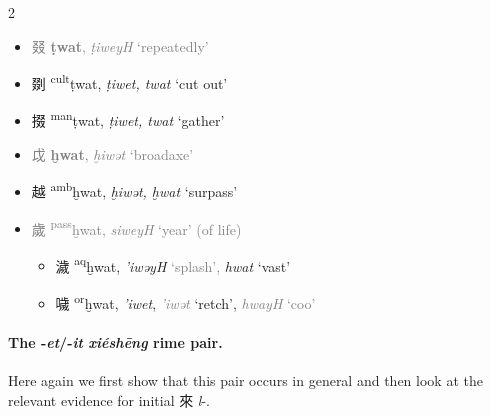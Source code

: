 \begin{multicols}{2}
\raggedcolumns
\begin{itemize}
  \item \textcolor{gray}{ {\Large{叕}} %
    {\large{\textbf{ṭwat}}},
    \textit{ṭiweyH} `repeatedly'} %

  \item {\Large{剟}} %
    {\large{{\textsuperscript{cult}}ṭwat}},
    \textit{ṭiwet, twat} `cut out' %

  \item {\Large{掇}} %
    {\large{{\textsuperscript{man}}ṭwat}},
    \textit{ṭiwet, twat} `gather' %
\end{itemize}

\medskip

\begin{minipage}{\columnwidth}
\begin{itemize}[leftmargin=*, labelsep=0.5em]   
  \item  \textcolor{gray}{{\Large{戉}} %
    {\large{\textbf{ḫwat}}},
    \textit{ḫiwət} `broadaxe'} %

  \item {\Large{越}} %
    {\large{{\textsuperscript{amb}}ḫwat}},
    \textit{ḫiwət, ḫwat} `surpass' %

  \item \textcolor{gray}{{\Large{歲}} 
    {\large{{\textsuperscript{pass}}ḫwat}}, \textit{siweyH} `year' (of life)}


\begin{itemize}
  \item {\Large{濊}} %
    {\large{{\textsuperscript{aq}}ḫwat}},
    \textit{'iwəyH} \textcolor{gray}{`splash',} \textit{hwat} `vast' %

  \item {\Large{噦}} %
    {\large{{\textsuperscript{or}}ḫwat}},
    \textit{'iwet}, \textcolor{gray}{\textit{'iwət}} `retch', \textcolor{gray}{\textit{hwayH} `coo'} %
\end{itemize}
\end{itemize}
\end{minipage}
\end{multicols}

\paragraph{The -\textit{et}/-\textit{it} \textit{xiéshēng} rime pair.}
\label{par:et-it-XS-pair}
Here again we first show that this pair occurs in general and then look at the relevant evidence for initial 來 \textit{l}-. 

